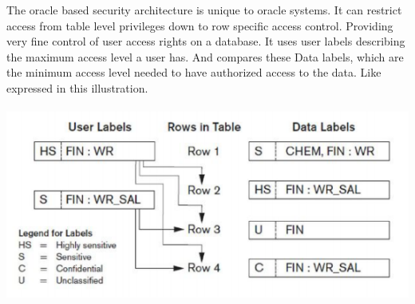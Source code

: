 \documentclass[12pt, letterpaper, twoside]{article}
\begin{document}
The oracle based security architecture is unique to oracle systems. It can restrict access from table level privileges down to row specific access control. Providing very fine control of user access rights on a database. It uses user labels describing the maximum access level a user has. And compares these Data labels, which are the minimum access level needed to have authorized access to the data. Like expressed in this illustration.\\
\ \\
\includegraphics[scale=0.8]{"oracle_labels.png"}
\ \\ 
\end{document}
